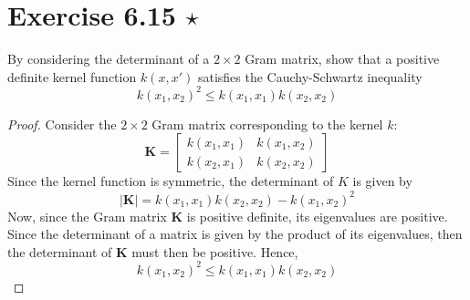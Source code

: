 \section*{Exercise 6.15 $\star$}
By considering the determinant of a $2 \times 2$ Gram matrix,
show that a positive definite kernel function $k(x, x')$ satisfies
the Cauchy-Schwartz inequality
\begin{equation}\label{eq:6.96}\tag{6.96}
    k(x_1, x_2)^2 \leq k(x_1, x_1)k(x_2, x_2)
\end{equation}

\vspace{1em}

\begin{proof}
    Consider the $2 \times 2$ Gram matrix corresponding to the kernel $k$:
    \[
        \mathbf{K} = 
        \begin{bmatrix}
            k(x_1, x_1) & k(x_1, x_2) \\
            k(x_2, x_1) & k(x_2, x_2)
        \end{bmatrix}
    \] 
    Since the kernel function is symmetric, the determinant of $K$ is given by
    \[
        |\mathbf{K}| = k(x_1, x_1) k(x_2, x_2) - k(x_1, x_2)^2
    \] 
    Now, since the Gram matrix $\mathbf{K}$ is positive definite, its eigenvalues
    are positive. Since the determinant of a matrix is given by the product
    of its eigenvalues, then the determinant of $\mathbf{K}$ must then be positive.
    Hence,
    \begin{equation}\tag{6.96}
        k(x_1, x_2)^2 \leq k(x_1, x_1)k(x_2, x_2)
    \end{equation}
\end{proof}
